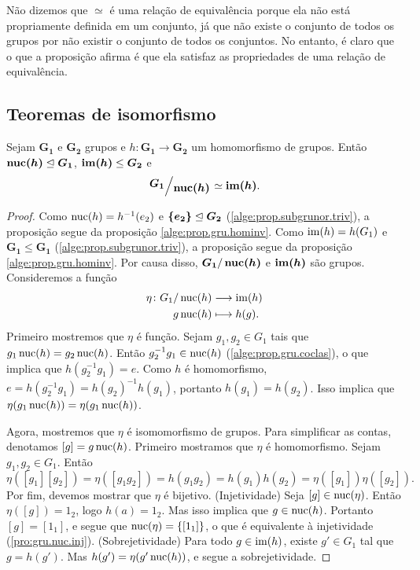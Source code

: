 Não dizemos que $\simeq$ é uma relação de equivalência porque ela não está propriamente definida em um conjunto, já que não existe o conjunto de todos os grupos por não existir o conjunto de todos os conjuntos. No entanto, é claro que o que a proposição afirma é que ela satisfaz as propriedades de uma relação de equivalência.

\subsection{Teoremas de isomorfismo}

\begin{theorem}
Sejam $\bm{G_1}$ e $\bm{G_2}$ grupos e $h: \bm{G_1} \to \bm{G_2}$ um homomorfismo de grupos. Então $\bm{\nuc(h)} \ide \bm{G_1}$, $\bm{\im(h)} \leq \bm{G_2}$ e 
	\begin{equation*}
	\bm{\quo{G_1}{\nuc(h)}} \simeq \bm{\im(h)}.
	\end{equation*}
\end{theorem}
\begin{proof} Como $\operatorname{nuc}(h) = h^{-1}(e_2)$ e $\bm{\{e_2\}} \mathrel{\unlhd} \bm{G_2}$ (\ref{alge:prop.subgrunor.triv}), a proposição segue da proposição \ref{alge:prop.gru.hominv}. Como $\operatorname{im}(h) = h(G_1)$ e $\bm{G_1} \leq \bm{G_1}$ (\ref{alge:prop.subgrunor.triv}), a proposição segue da proposição \ref{alge:prop.gru.hominv}. Por causa disso, $\bm{G_1}/\bm{\nuc(h)}$ e $\bm{\im(h)}$ são grupos. Consideremos a função
		\begin{align*}
		{\eta}\colon {G_1 / \operatorname{nuc}(h)} &\longrightarrow {\operatorname{im}(h)} \\{g\operatorname{nuc}(h)} &\longmapsto h(g).
		\end{align*}
Primeiro mostremos que $\eta$ é função. Sejam $g_1,g_2 \in G_1$ tais que $g_1\operatorname{nuc}(h) = g_2\operatorname{nuc}(h)$. Então $g_2^{-1}g_1 \in \operatorname{nuc}(h)$ (\ref{alge:prop.gru.coclas}), o que implica que $h(g_2^{-1}g_1) = e$. Como $h$ é homomorfismo, $e = h(g_2^{-1}g_1) = h(g_2)^{-1}h(g_1)$, portanto $h(g_1)=h(g_2)$. Isso implica que $\eta(g_1\operatorname{nuc}(h))=\eta(g_1\operatorname{nuc}(h))$.

Agora, mostremos que $\eta$ é isomomorfismo de grupos. Para simplificar as contas, denotamos $[g] = g\operatorname{nuc}(h)$. Primeiro mostramos que $\eta$ é homomorfismo. Sejam $g_1,g_2 \in G_1$. Então
	\begin{equation*}
	\eta([g_1][g_2]) = \eta([g_1g_2]) = h(g_1g_2) = h(g_1)h(g_2) = \eta([g_1])\eta([g_2]).
	\end{equation*}
Por fim, devemos mostrar que $\eta$ é bijetivo. (Injetividade) Seja $[g] \in \operatorname{nuc}(\eta)$. Então $\eta([g])=1_{2}$, logo $h(a)=1_2$. Mas isso implica que $g \in \operatorname{nuc}(h)$. Portanto $[g]=[1_1]$, e segue que $\operatorname{nuc}(\eta)=\{[1_1]\}$, o que é equivalente à injetividade (\ref{pro:gru.nuc.inj}). (Sobrejetividade) Para todo $g \in \operatorname{im}(h)$, existe $g' \in G_1$ tal que $g=h(g')$. Mas $h(g')=\eta(g'\operatorname{nuc}(h))$, e segue a sobrejetividade.
\end{proof}

